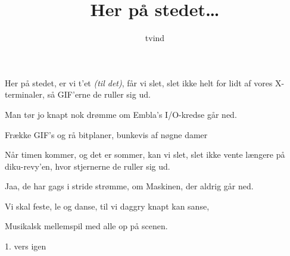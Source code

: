\documentclass{article}
\title{Her på stedet\ldots}
\author{tvind}
\begin{document}
\maketitle
\large
\flushsingsright
\begin{song}
%
Her på stedet, er vi t'et {\em (til det)},
får vi slet, slet ikke helt for lidt af vores X-terminaler,
så GIF'erne de ruller sig ud.

Man tør jo knapt nok drømme
om Embla's I/O-kredse går ned.

Frække GIF's og rå bitplaner,
bunkevis af nøgne damer

\bigskip

%
Når timen kommer, og det er sommer,
kan vi slet, slet ikke vente længere på {\sc diku}-revy'en,
hvor stjernerne de ruller sig ud.

Jaa, de har gags i stride strømme, 
om Maskinen, der aldrig går ned.

Vi skal feste, le og danse,
til vi daggry knapt kan sanse,


\scene Musikalsk mellemspil med alle op på scenen.

1. vers igen
\end{song}
\end{document}
